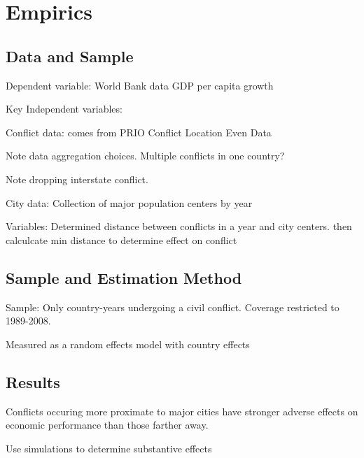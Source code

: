 \section{Empirics}
\label{empirics}

\subsection{Data and Sample}

Dependent variable: World Bank data GDP per capita growth 

Key Independent variables: 

	Conflict data: comes from PRIO Conflict Location Even Data 

		Note data aggregation choices.  Multiple conflicts in one country?

		Note dropping interstate conflict.

	City data: Collection of major population centers by year 

	Variables: Determined distance between conflicts in a year and city centers. then calculcate min distance to determine effect on conflict 

\subsection{Sample and Estimation Method}

Sample: Only country-years undergoing a civil conflict. Coverage restricted to 1989-2008. 

Measured as a random effects model with country effects 

\subsection{Results} 

Conflicts occuring more proximate to major cities have stronger adverse effects on economic performance than those farther away. 

Use simulations to determine substantive effects